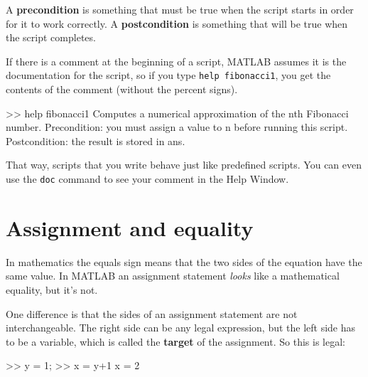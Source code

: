 \documentclass[
]{book}
\numberwithin{Answer}{chapter}
\numberwithin{Exercise}{chapter}
\begin{document}

\begin{code}
\end{code}

A {\bf precondition} is something that must be true when the script
starts in order for it to work correctly.  A {\bf postcondition}
is something that will be true when the script completes.


If there is a comment at the beginning of a script, MATLAB assumes
it is the documentation for the script, so if you type {\tt help
fibonacci1}, you get the contents of the comment (without the percent
signs).

\begin{code}
>> help fibonacci1
  Computes a numerical approximation of the nth Fibonacci number.  
  Precondition: you must assign a value to n before running this script.
  Postcondition: the result is stored in ans.
\end{code}

That way, scripts that you write behave just like predefined scripts.
You can even use the {\tt doc} command to see your comment in the
{\sf Help Window}.


\section{Assignment and equality}


In mathematics the equals sign means that the two sides of the
equation have the same value.  In MATLAB an assignment statement
{\em looks} like a mathematical equality, but it's not.

One difference is that the sides of an assignment statement are not
interchangeable.  The right side can be any legal expression, but
the left side has to be a variable, which is called the 
{\bf target} of the assignment.  So this is legal:

\begin{code}
>> y = 1;
>> x = y+1
x = 2
\end{code}
\end{document}

